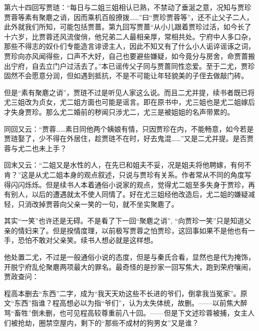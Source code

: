 \par 第六十四回写贾琏：“每日与二姐三姐相认已熟，不禁动了垂涎之意，况知与贾珍贾蓉等素有聚麀之诮，因而乘机百般撩拨……”曰“贾珍贾蓉等”，还不止父子二人，此外就我们所知，可能包括贾蔷。第九回写贾蔷“从小儿跟着贾珍过活，如今长了十六岁，比贾蓉还风流俊俏，他兄弟二人最相亲厚，常相共处。宁府中人多口杂，那些不得志的奴仆们专能造言诽谤主人，因此不知又有了什么小人诟谇谣诼之词，贾珍向亦风闻得些，口声不大好，自己也要避些嫌疑，如今竟分与房舍，命贾蔷搬出宁府，自去立门户过活去了。”本已谣传父子同与贾蔷同性恋爱。至于二尤，贾珍固然不会愿意分润，但如遇到抵抗，不是不可能让年轻貌美的子侄去做敲门砖。
\par 但是“素有聚麀之诮”，贾琏不过是听见人家这么说。而且二尤并提，续书者既已将尤三姐改为贞女，尤二姐方面也可能是谣言。即在原书中，尤三姐也是尤二姐嫁后才失身贾珍。那么尤二婚前的秽闻只涉尤二，尤三是被姐姐的名声带累的。
\par 同回又云：“贾蓉……素日同他两个姨娘有情，只因贾珍在内，不能畅意，如今若是贾琏娶了，少不得在外居住，趁贾琏不在时，好去鬼混……”又是二尤并提。是否贾蓉与尤二也未上手？
\par 回末又云：“二姐又是水性的人，在先已和姐夫不妥，况是姐夫将他聘嫁，有何不肯？”这是从尤二姐本身的观点叙述，只说与贾珍有关系。作者常从不同的角度写得闪闪烁烁。但是续书人本着通俗小说家的观点，觉得尤二姐至多失身于贾珍，再有别人，以后的遭遇就太不使人同情了。好在尤三姐经他改造后，尤二姐的嫌疑减轻，只消改掉贾蓉向父亲一笑的一句，就不坐实聚麀了。
\par 其实“一笑”也许还是无碍。不是看了下一回“聚麀之诮”, “向贾珍一笑”只是知道父亲的情妇来了。但是揆情度理，以前极写贾蓉之怕贾珍，这回事如果不是他也有一手，恐怕不敢对父亲笑。续书人想必就是这样想。
\par 他处置二尤，不过是一般通俗小说的态度，但是与秦氏合看，显然也是代为掩饰，开脱宁府乱伦聚麀两项最大的罪名。最奇怪的是抄家一回写焦大，跑到荣府嚷闹，贾政查问：
\par 程高本删去“东西”二字，成为“我天天劝这些不长进的爷们，倒拿我当冤家”。原文“东西”指谁？程高想必以为指“爷们”，认为太失体统，故删。——以前焦大醉骂“畜牲”倒未删，也可见程高较尊重前八十回。——但是下文述珍蓉被捕，女主人们被抢劫，圈禁空屋内，剩下的“那些不成材的狗男女”又是谁？
